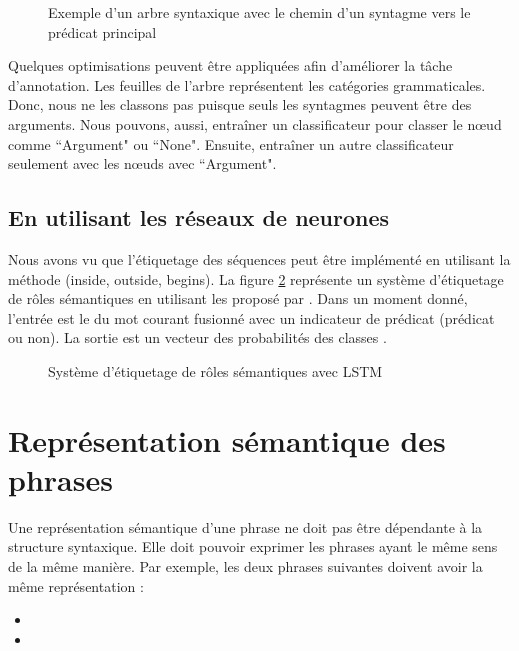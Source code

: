 \documentclass{KodeBook}
\begin{document}
\begin{figure}[ht]
	\centering
	\caption[Exemple d'un arbre syntaxique avec le chemin vers le prédicat principal]{Exemple d'un arbre syntaxique avec le chemin d'un syntagme vers le prédicat principal \cite{2019-jurafsky-martin}}
	\label{fig:srl-arbre-chemin}
\end{figure}

Quelques optimisations peuvent être appliquées afin d'améliorer la tâche d'annotation.
Les feuilles de l'arbre représentent les catégories grammaticales. 
Donc, nous ne les classons pas puisque seuls les syntagmes peuvent être des arguments. 
Nous pouvons, aussi, entraîner un classificateur pour classer le nœud comme ``Argument" ou ``None".
Ensuite, entraîner un autre classificateur seulement avec les nœuds avec ``Argument".


\subsection{En utilisant les réseaux de neurones}

Nous avons vu que l'étiquetage des séquences peut être implémenté en utilisant la méthode   (inside, outside, begins). 
La figure \ref{fig:srl-embedding} représente un système d'étiquetage de rôles sémantiques en utilisant les  proposé par \citet{2017-he-al}. 
Dans un moment donné, l'entrée est le  du mot courant fusionné avec un indicateur de prédicat (prédicat ou non). 
La sortie est un vecteur des probabilités des classes .

\begin{figure}[ht]
	\centering
	\caption[Système d'étiquetage de rôles sémantiques avec LSTM]{Système d'étiquetage de rôles sémantiques avec LSTM \cite{2017-he-al}}
	\label{fig:srl-embedding}
\end{figure}

\section{Représentation sémantique des phrases}

Une représentation sémantique d'une phrase ne doit pas être dépendante à la structure syntaxique. 
Elle doit pouvoir exprimer les phrases ayant le même sens de la même manière. 
Par exemple, les deux phrases suivantes doivent avoir la même représentation :
\begin{itemize}
	\item {}
	\item {}
\end{itemize}
\end{document}
